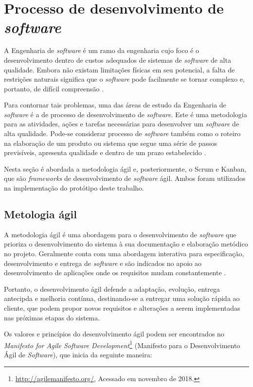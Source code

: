 \section{Processo de desenvolvimento de \textit{software}}

A Engenharia de \textit{software} é um ramo da engenharia cujo foco é o desenvolvimento dentro de custos adequados de sistemas de \textit{software} de alta qualidade. Embora não existam limitações físicas em seu potencial, a falta de restrições naturais significa que o \textit{software} pode facilmente se tornar complexo e, portanto, de difícil compreensão \cite{sommerville}.

Para contornar tais problemas, uma das áreas de estudo da Engenharia de \textit{software} é a de processo de desenvolvimento de \textit{software}. Este é uma metodologia para as atividades, ações e tarefas necessárias para desenvolver um \textit{software} de alta qualidade. Pode-se considerar processo de \textit{software} também como o roteiro na elaboração de um produto ou sistema que segue uma série de passos previsíveis, apresenta qualidade e dentro de um prazo estabelecido \cite{pressman}.

Nesta seção é abordada a metodologia ágil e, posteriormente, o Scrum e Kanban, que são \textit{frameworks} de desenvolvimento de \textit{software} ágil. Ambos foram utilizados na implementação do protótipo deste trabalho.


\subsection{Metologia ágil}
\label{fundSWAgil}

A metodologia ágil é uma abordagem para o desenvolvimento de \textit{software} que prioriza o desenvolvimento do sistema à sua documentação e elaboração metódico no projeto. Geralmente conta com uma abordagem interativa para especificação, desenvolvimento e entrega de \textit{software} e são indicados no apoio ao desenvolvimento de aplicações onde os requisitos mudam constantemente \cite{sommerville}.

Portanto, o desenvolvimento ágil defende a adaptação, evolução, entrega antecipda e melhoria contínua, destinando-se a entregar uma solução rápida ao cliente, que podem propor novos requisitos e alterações a serem implementadas nas próximas etapas do sistema.

Os valores e princípios do desenvolvimento ágil podem ser encontrados no \textit{Manifesto for Agile Software Development}\footnote{\url{http://agilemanifesto.org/}, Acessado em novembro de 2018.} (Manifesto para o Desenvolvimento Ágil de \textit{Software}), que inicia da seguinte maneira:

